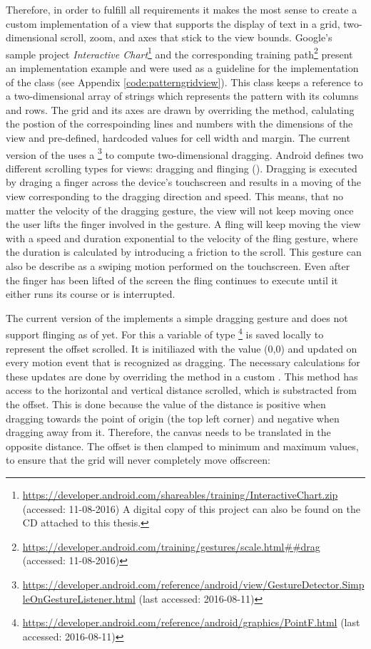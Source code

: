 Therefore, in order to fulfill all requirements it makes the most sense to create a custom implementation of a view that supports the display of text in a grid, two-dimensional scroll, zoom, and axes that stick to the view bounds. Google's sample project \textit{Interactive Chart}\footnote{\url{https://developer.android.com/shareables/training/InteractiveChart.zip} (accessed: 11-08-2016) A digital copy of this project can also be found on the CD attached to this thesis.} and the corresponding training path\footnote{\url{https://developer.android.com/training/gestures/scale.html##drag} (accessed: 11-08-2016)} present an implementation example and were used as a guideline for the implementation of the class  (see Appendix \ref{code:patterngridview}). This class keeps a reference to a two-dimensional array of strings which represents the pattern with its columns and rows. The grid and its axes are drawn by overriding the  method, calulating the postion of the correspoinding lines and numbers with the dimensions of the view and pre-defined, hardcoded values for cell width and margin. The current version of the  uses a \footnote{\url{https://developer.android.com/reference/android/view/GestureDetector.SimpleOnGestureListener.html} (last accessed: 2016-08-11)} to compute two-dimensional dragging. Android defines two different scrolling types for views: dragging and flinging (\cite{android_scrolling_types}). Dragging is executed by draging a finger across the device's touchscreen and results in a moving of the view corresponding to the dragging direction and speed. This means, that no matter the velocity of the dragging gesture, the view will not keep moving once the user lifts the finger involved in the gesture. A fling will keep moving the view with a speed and duration exponential to the velocity of the fling gesture, where the duration is calculated by introducing a friction to the scroll. This gesture can also be describe as a swiping motion performed on the touchscreen. Even after the finger has been lifted of the screen the fling continues to execute until it either runs its course or is interrupted.

The current version of the  implements a simple dragging gesture and does not support flinging as of yet. For this a variable of type \footnote{\url{https://developer.android.com/reference/android/graphics/PointF.html} (last accessed: 2016-08-11)} is saved locally to represent the offset scrolled. It is initiliazed with the value (0,0) and updated on every motion event that is recognized as dragging. The necessary calculations for these updates are done by overriding the  method in a custom . This method has access to the horizontal and vertical distance scrolled, which is substracted from the offset. This is done because the value of the distance is positive when dragging towards the point of origin (the top left corner) and negative when dragging away from it. Therefore, the canvas needs to be translated in the opposite distance. The offset is then clamped to minimum and maximum values, to ensure that the grid will never completely move offscreen: 

